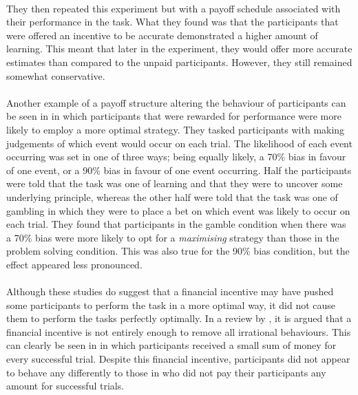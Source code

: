 \documentclass[12pt]{article}
\begin{document}
\paragraph{} They then repeated this experiment but with a payoff schedule associated with their performance in the task. What they found was that the participants that were offered an incentive to be accurate demonstrated a higher amount of learning. This meant that later in the experiment, they would offer more accurate estimates than compared to the unpaid participants. However, they still remained somewhat conservative. 

\paragraph{} Another example of a payoff structure altering the behaviour of participants can be seen in \cite{Goodnow1955} in which participants that were rewarded for performance were more likely to employ a more optimal strategy. They tasked participants with making judgements of which event would occur on each trial. The likelihood of each event occurring was set in one of three ways; being equally likely, a 70\% bias in favour of one event, or a 90\% bias in favour of one event occurring. Half the participants were told that the task was one of learning and that they were to uncover some underlying principle, whereas the other half were told that the task was one of gambling in which they were to place a bet on which event was likely to occur on each trial. They found that participants in the gamble condition when there was a 70\% bias were more likely to opt for a \textit{maximising} strategy than those in the problem solving condition. This was also true for the 90\% bias condition, but the effect appeared less pronounced. 

\paragraph{} Although these studies do suggest that a financial incentive may have pushed some participants to perform the task in a more optimal way, it did not cause them to perform the tasks perfectly optimally. In a review by \cite{Camerer1999}, it is argued that a financial incentive is not entirely enough to remove all irrational behaviours. This can clearly be seen in \cite{morvan2012human} in which participants received a small sum of money for every successful trial. Despite this financial incentive, participants did not appear to behave any differently to those in \cite{clarke2015failure} who did not pay their participants any amount for successful trials. 
\end{document}
